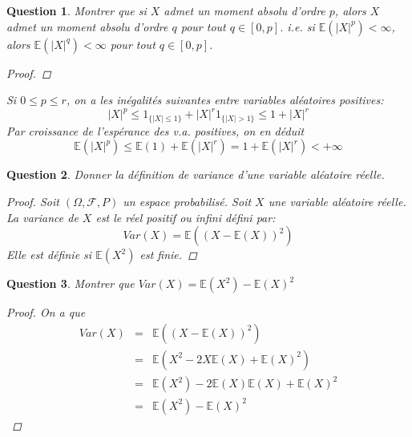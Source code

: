 \documentclass{article}
\theoremstyle{plain}
\newtheorem{question}{Question}
\theoremstyle{definition}
\begin{document}
\begin{question}
	Montrer que si $X$ admet un moment absolu d'ordre $p$, alors $X$ admet un moment absolu d'ordre $q$ pour tout $q \in [0, p]$.
	i.e. si $\mathbb{E} (|X|^p) < \infty$, alors $\mathbb{E} (|X|^q) < \infty$ pour tout $q \in [0, p]$.
	\begin{proof}
	\end{proof}
	Si $0 \leq p \leq r$, on a les inégalités suivantes entre variables aléatoires positives:
	$$|X|^p \leq \mathscr{1}_{\{|X|\leq 1\}} + |X|^r\mathscr{1}_{\{|X|>1\}} \leq 1 + |X|^r$$
	Par croissance de l’espérance des v.a. positives, on en déduit
	$$\mathbb{E}(|X|^p) \leq \mathbb{E}(1) + \mathbb{E}(|X|^r) = 1 + \mathbb{E}(|X|^r) < +\infty$$

\end{question}

\begin{question}
	Donner la définition de variance d'une variable aléatoire réelle.
	\begin{proof}
		Soit $(\Omega, \mathscr{F}, P)$ un espace probabilisé. Soit $X$ une variable aléatoire réelle. La variance de $X$ est le réel positif ou infini défini par:
		\begin{equation*}
			Var(X) = \mathbb{E} ((X - \mathbb{E} (X))^2)
		\end{equation*}
		Elle est définie si $\mathbb{E} (X^2)$ est finie.
	\end{proof}
\end{question}

\begin{question}
	Montrer que $Var(X) = \mathbb{E} (X^2) - \mathbb{E} (X)^2$
	\begin{proof}
		On a que
		\begin{eqnarray*}
			Var(X) &=& \mathbb{E} ((X - \mathbb{E} (X))^2) \\
			&=& \mathbb{E} (X^2 - 2X\mathbb{E} (X) + \mathbb{E} (X)^2) \\
			&=& \mathbb{E} (X^2) - 2\mathbb{E} (X)\mathbb{E} (X) + \mathbb{E} (X)^2 \\
			&=& \mathbb{E} (X^2) - \mathbb{E} (X)^2
		\end{eqnarray*}
	\end{proof}
\end{question}
\end{document}
